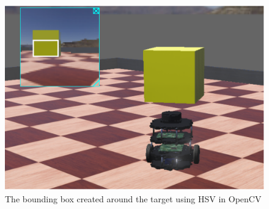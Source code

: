 \begin{figure}[H]
    \centering
    \includegraphics[width=0.8\linewidth]{assets/images/object_detection/Figure5.png}
    \caption{The bounding box created around the target using HSV in OpenCV}
    \label{fig:object detection figure 5.} 
\end{figure}
